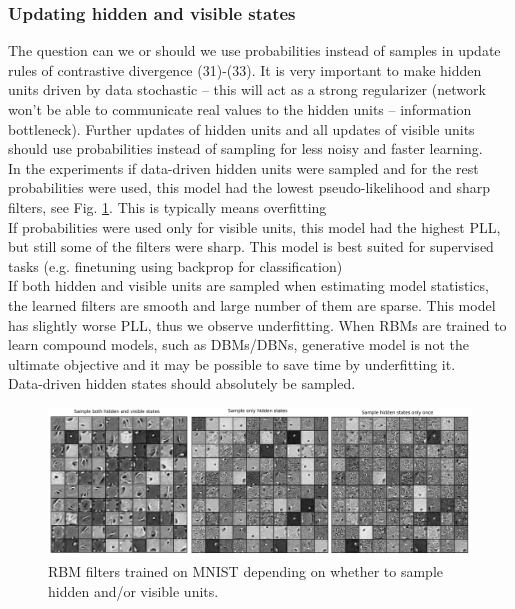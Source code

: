 \subsubsection{Updating hidden and visible states}
The question can we or should we use probabilities instead of samples in update rules of contrastive divergence (31)-(33). It is very important to make hidden units driven by data stochastic -- this will act as a strong regularizer (network won't be able to communicate real values to the hidden units -- information bottleneck). Further updates of hidden units and all updates of visible units should use probabilities instead of sampling for less noisy and faster learning.
\\[0.5em]
\bad In the experiments if data-driven hidden units were sampled and for the rest probabilities were used, this model had the lowest pseudo-likelihood and sharp filters, see Fig. \ref{fig:rbm_sampling}. This is typically means overfitting
\\
\textbullet{} If probabilities were used only for visible units, this model had the highest PLL, but still some of the filters were sharp. This model is best suited for supervised tasks (e.g. finetuning using backprop for classification)
\\
\textbullet{} If both hidden and visible units are sampled when estimating model statistics, the learned filters are smooth and large number of them are sparse. This model has slightly worse PLL, thus we observe underfitting. When RBMs are trained to learn compound models, such as DBMs/DBNs, generative model is not the ultimate objective and it may be possible to save time by underfitting it.
\\
\good Data-driven hidden states should absolutely be sampled.
\begin{figure}[h]
\begin{mdframed}
\includegraphics[scale=0.17]{rbm-mnist/rbm_sampling.png}
\centering
\caption{RBM filters trained on MNIST depending on whether to sample hidden and/or visible units.}
\label{fig:rbm_sampling}
\end{mdframed}
\end{figure}

